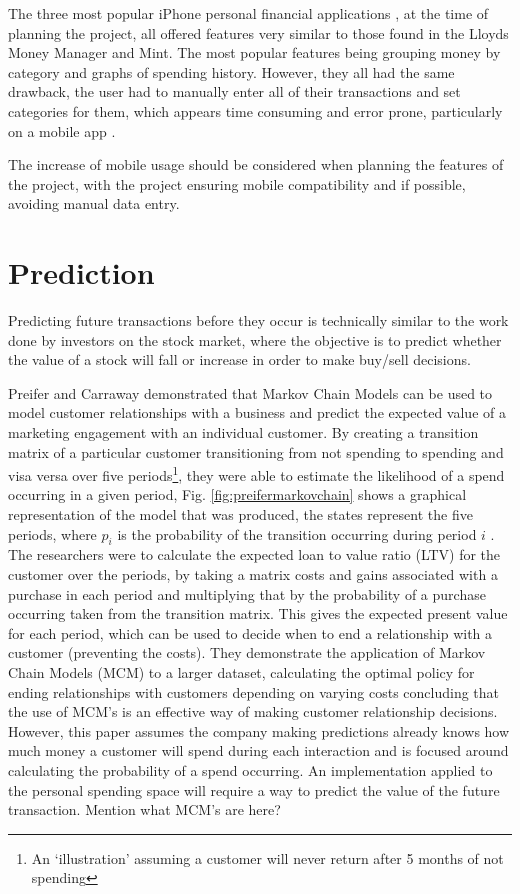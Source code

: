 The three most popular iPhone personal financial applications \cite{itunes2013topapps}, at the time of planning the project, all offered features very similar to those found in the Lloyds Money Manager and Mint. The most popular features being grouping money by \gls{category} and graphs of spending history.
% 
However, they all had the same drawback, the user had to manually enter all of their transactions and set categories for them, which appears time consuming and error prone, particularly on a mobile app \cite{spendee2014spendee,budgt2013budgt,bluetags2014pocket}.

The increase of mobile usage should be considered when planning the features of the project, with the project ensuring mobile compatibility and if possible, avoiding manual data entry. 

\section{Prediction}
Predicting future transactions before they occur is technically similar to the work done by investors on the stock market, where the objective is to predict whether the value of a stock will fall or increase in order to make buy/sell decisions.

Preifer and Carraway demonstrated that Markov Chain Models can be used to model customer relationships with a business and predict the expected value of a marketing engagement with an individual customer. By creating a transition matrix of a particular customer transitioning from not spending to spending and visa versa over five periods\footnote{An `illustration' assuming a customer will never return after 5 months of not spending}, they were able to estimate the likelihood of a spend occurring in a given period, Fig. \ref{fig:preifermarkovchain} shows a graphical representation of the model that was produced, the states represent the five periods, where $p_{i}$ is the probability of the transition occurring during period $i$ \cite{pfeifer2000modeling}.
% 
The researchers were to calculate the expected loan to value ratio (LTV) for the customer over the periods, by taking a matrix costs and gains associated with a purchase in each period and multiplying that by the probability of a purchase occurring taken from the transition matrix. This gives the expected present value for each period, which can be used to decide when to end a relationship with a customer (preventing the costs).
%
They demonstrate the application of Markov Chain Models (MCM) to a larger dataset, calculating the optimal policy for ending relationships with customers depending on varying costs concluding that the use of MCM's is an effective way of making customer relationship decisions. However, this paper assumes the company making predictions already knows how much money a customer will spend during each interaction and is focused around calculating the probability of a spend occurring. An implementation applied to the personal spending space will require a way to predict the value of the future transaction.
{Mention what MCM's are here?} 

